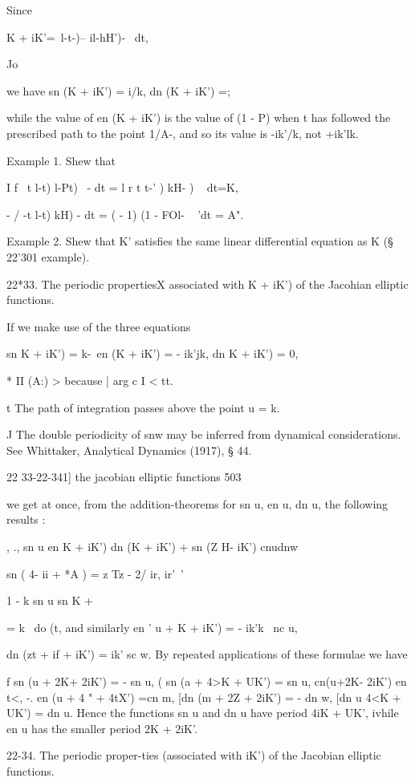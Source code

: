 Since

K + iK'=\ l-t-)-- il-hH')- ~dt,

Jo

we have sn (K + iK') = i/k, dn (K + iK') =;

while the value of en (K + iK') is the value of (1 - P) when t has
followed the prescribed path to the point 1/A-, and so its value is
-ik'/k, not +ik'lk.

Example 1. Shew that

I f \ t l-t) l-Pt) ~- dt = l r t t-' ) kH- ) ~ dt=K,

- / -t l-t) kH) - dt = ( - 1) (1 - FOl- ~ 'dt = A".

Example 2. Shew that K' satisfies the same linear differential
equation as K (§ 22'301 example).

22*33. The periodic propertiesX associated with K + iK') of the
Jacohian elliptic functions.

If we make use of the three equations

sn K + iK') = k-\ en (K + iK') = - ik'jk, dn K + iK') = 0,

* II (A:) > because | arg c I < tt.

t The path of integration passes above the point u = k.

J The double periodicity of snw may be inferred from dynamical
considerations. See Whittaker, Analytical Dynamics (1917), § 44.

22 33-22-341] the jacobian elliptic functions 503

we get at once, from the addition-theorems for sn u, en u, dn u, the
following results :

, ., sn u en K + iK') dn (K + iK') + sn (Z H- iK') cnudnw

sn ( 4- ii + *A ) = z Tz - 2/ ir, ir'\ '

  1 - k sn u sn K +%

= k~ do (t, and similarly en ' u + K + iK') = - ik'k~ nc u,

dn (zt + if + iK') = ik' sc w. By repeated applications of these
formulae we have

f sn (u + 2K+ 2iK') = - sn u, ( sn (a + 4>K + UK') = sn u, cn(u+2K-
2iK') en t<, -. en (u + 4 " + 4tX') =cn m, [dn (m + 2Z + 2iK') = - dn
w, [dn u 4<K + UK') = dn u. Hence the functions sn u and dn u have
period 4iK + UK', ivhile en u has the smaller period 2K + 2iK'.

22-34. The periodic proper-ties (associated with iK') of the Jacobian
elliptic functions.

